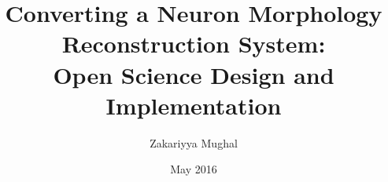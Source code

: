 \title{\bf \large Converting a Neuron Morphology Reconstruction
System:\\Open Science Design and Implementation}
\author{Zakariyya Mughal}
\date{May 2016}



